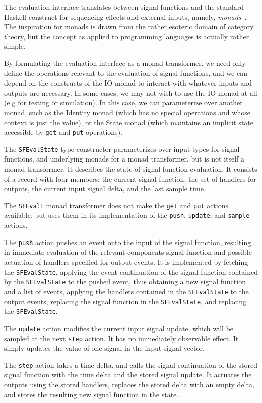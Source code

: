 The evaluation interface translates between signal functions and the standard
Haskell construct for sequencing effects and external inputs, namely,
{\em monads}~\cite{PeytonJones1993}. The inspiration for monads is drawn from
the rather esoteric domain of category theory, but the concept as applied to
programming languages is actually rather simple.

By formulating
the evaluation interface as a monad transformer, we need only define the
operations relevant to the evaluation of signal functions, and we can depend
on the constructs of the IO monad to interact with whatever inputs and outputs
are necessary. In some cases, we may not wish to use the IO monad at all (e.g
for testing or simulation). In this case, we can parameterize over another
monad, such as the Identity monad (which has no special operations and whose
context is just the value), or the State monad (which maintains an implicit 
state accessible by {\tt get} and {\tt put} operations).

The {\tt SFEvalState} type constructor parameterizes over input types for signal
functions, and underlying monads for a monad transformer, but is not itself
a monad transformer. It describes the state of signal function evaluation.
It consists of a record with four members: the current signal function,
the set of handlers for outputs, the current input signal delta, and the last
sample time.

The {\tt SFEvalT} monad transformer does not make the {\tt get} and {\tt put}
actions available, but uses them in its implementation of the {\tt push},
{\tt update}, and {\tt sample} actions.

The {\tt push} action pushes an event onto the input of the signal function,
resulting in immediate evaluation of the relevant components signal function
and possible actuation of handlers specified for output events. It is
implemented by fetching the {\tt SFEvalState}, applying the event continuation
of the signal function contained by the {\tt SFEvalState} to the pushed event,
thus obtaining a new signal function and a list of events, applying the handlers
contained in the {\tt SFEvalState} to the output events, replacing the signal
function in the {\tt SFEvalState}, and replacing the {\tt SFEvalState}.

The {\tt update} action modifies the current input signal update, which will be
sampled at the next {\tt step} action. It has no immediately observable effect.
It simply updates the value of one signal in the input signal vector.

The {\tt step} action takes a time delta, and calls the signal continuation of
the stored signal function with the time delta and the stored signal update. It
actuates the outputs using the stored handlers, replaces the stored delta with
an empty delta, and stores the resulting new signal function in the state.
